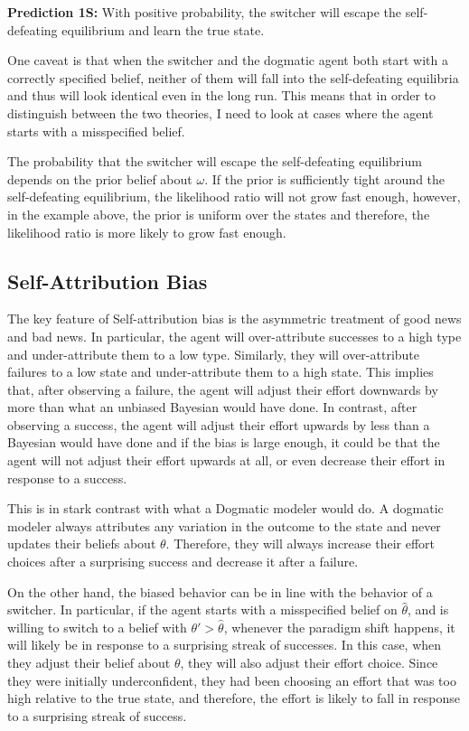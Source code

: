 \documentclass[
  12pt,
]{article}
\begin{document}
\textbf{Prediction 1S:} With positive probability, the switcher will
escape the self-defeating equilibrium and learn the true state.

One caveat is that when the switcher and the dogmatic agent both start
with a correctly specified belief, neither of them will fall into the
self-defeating equilibria and thus will look identical even in the long
run. This means that in order to distinguish between the two theories, I
need to look at cases where the agent starts with a misspecified belief.

The probability that the switcher will escape the self-defeating
equilibrium depends on the prior belief about \(\omega\). If the prior
is sufficiently tight around the self-defeating equilibrium, the
likelihood ratio will not grow fast enough, however, in the example
above, the prior is uniform over the states and therefore, the
likelihood ratio is more likely to grow fast enough.

\hypertarget{self-attribution-bias}{%
\subsection{Self-Attribution Bias}\label{self-attribution-bias}}

The key feature of Self-attribution bias is the asymmetric treatment of
good news and bad news. In particular, the agent will over-attribute
successes to a high type and under-attribute them to a low type.
Similarly, they will over-attribute failures to a low state and
under-attribute them to a high state. This implies that, after observing
a failure, the agent will adjust their effort downwards by more than
what an unbiased Bayesian would have done. In contrast, after observing
a success, the agent will adjust their effort upwards by less than a
Bayesian would have done and if the bias is large enough, it could be
that the agent will not adjust their effort upwards at all, or even
decrease their effort in response to a success.

This is in stark contrast with what a Dogmatic modeler would do. A
dogmatic modeler always attributes any variation in the outcome to the
state and never updates their beliefs about \(\theta\). Therefore, they
will always increase their effort choices after a surprising success and
decrease it after a failure.

On the other hand, the biased behavior can be in line with the behavior
of a switcher. In particular, if the agent starts with a misspecified
belief on \(\hat{\theta}\), and is willing to switch to a belief with
\(\theta'>\hat{\theta}\), whenever the paradigm shift happens, it will
likely be in response to a surprising streak of successes. In this case,
when they adjust their belief about \(\theta\), they will also adjust
their effort choice. Since they were initially underconfident, they had
been choosing an effort that was too high relative to the true state,
and therefore, the effort is likely to fall in response to a surprising
streak of success.
\end{document}
